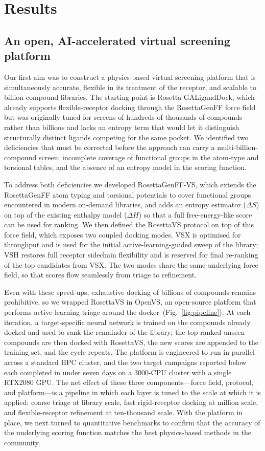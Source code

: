 \documentclass[11pt]{article}
\begin{document}
\section{Results}

\subsection{An open, AI-accelerated virtual screening platform}

Our first aim was to construct a physics-based virtual screening platform
that is simultaneously accurate, flexible in its treatment of the receptor,
and scalable to billion-compound libraries. The starting point is Rosetta
GALigandDock, which already supports flexible-receptor docking through the
RosettaGenFF force field but was originally tuned for screens of hundreds
of thousands of compounds rather than billions and lacks an entropy term
that would let it distinguish structurally distinct ligands competing for
the same pocket. We identified two deficiencies that must be corrected
before the approach can carry a multi-billion-compound screen: incomplete
coverage of functional groups in the atom-type and torsional tables, and
the absence of an entropy model in the scoring function.

To address both deficiencies we developed RosettaGenFF-VS, which extends
the RosettaGenFF atom typing and torsional potentials to cover functional
groups encountered in modern on-demand libraries, and adds an entropy
estimator ($\Delta S$) on top of the existing enthalpy model ($\Delta H$)
so that a full free-energy-like score can be used for ranking. We then
defined the RosettaVS protocol on top of this force field, which exposes
two coupled docking modes. VSX is optimised for throughput and is used
for the initial active-learning-guided sweep of the library; VSH restores
full receptor sidechain flexibility and is reserved for final re-ranking
of the top candidates from VSX. The two modes share the same underlying
force field, so that scores flow seamlessly from triage to refinement.

Even with these speed-ups, exhaustive docking of billions of compounds
remains prohibitive, so we wrapped RosettaVS in OpenVS, an open-source
platform that performs active-learning triage around the
docker~(Fig.~\ref{fig:pipeline}). At each iteration, a target-specific
neural network is trained on the compounds already docked and used to
rank the remainder of the library; the top-ranked unseen compounds are
then docked with RosettaVS, the new scores are appended to the training
set, and the cycle repeats. The platform is engineered to run in parallel
across a standard HPC cluster, and the two target campaigns reported
below each completed in under seven days on a 3000-CPU cluster with a
single RTX2080 GPU. The net effect of these three components---force
field, protocol, and platform---is a pipeline in which each layer is
tuned to the scale at which it is applied: coarse triage at
library scale, fast rigid-receptor docking at million scale, and
flexible-receptor refinement at ten-thousand scale. With the platform in
place, we next turned to quantitative benchmarks to confirm that the
accuracy of the underlying scoring function matches the best physics-based
methods in the community.
\end{document}
